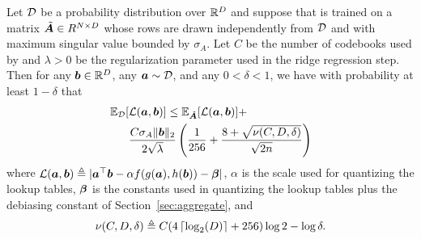 \begin{theorem*} \label{thm:maddnessAppendix}
Let $\mathcal{D}$ be a probability distribution over $\mathbb{R}^D$ and suppose that \oursp is trained on a matrix $\tilde{\bm{A}} \in R^{N \times D}$ whose rows are drawn independently from $\mathcal{D}$ and with maximum singular value bounded by $\sigma_A$. Let $C$ be the number of codebooks used by \oursp and $\lambda > 0$ be the regularization parameter used in the ridge regression step. %
Then for any $\bm{b} \in \mathbb{R}^D$, any $\bm{a} \sim \mathcal{D}$, and any $0 < \delta < 1$, we have with probability at least $1 - \delta$ that
\begin{align*}
    \begin{split}
    \mathbb{E}_{\mathcal{D}}[&\mathcal{L}(\bm{a}, \bm{b})] \le \mathbb{E}_{\tilde{\bm{A}}}[\mathcal{L}(\bm{a}, \bm{b})] + \\
    &\frac{C \sigma_A \lVert\bm{b}\rVert_2}{2 \sqrt{\lambda}} \left(
        \frac{1}{256} +
        \frac{
            8 +
            \sqrt{
                \nu(C, D, \delta)
            }
        }{\sqrt{2n}}
    \right)
    \end{split}
\end{align*}
where $\mathcal{L}(\bm{a}, \bm{b}) \triangleq |\bm{a}^\top \bm{b} - \alpha f(g(\bm{a}), h(\bm{b})) - \bm{\beta}|$, $\alpha$ is the scale used for quantizing the lookup tables, $\bm{\beta}$ is the constants used in quantizing the lookup tables plus the debiasing constant of Section~\ref{sec:aggregate}, and
\begin{align*}
    \nu(C, D, \delta) \triangleq C (4\left \lceil \log_2(D) \right \rceil + 256) \log{2} -\log{\delta}.
\end{align*}

\end{theorem*}

